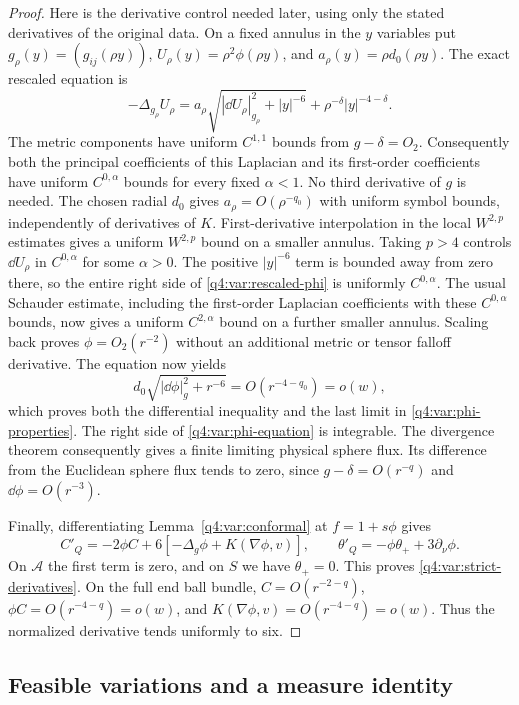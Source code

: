 \begin{proof}
Here is the derivative control needed later, using only the stated
derivatives of the original data. On a fixed annulus in the $y$ variables
put $g_\rho(y)=(g_{ij}(\rho y))$, $U_\rho(y)=\rho^2\phi(\rho y)$, and
$a_\rho(y)=\rho d_0(\rho y)$. The exact rescaled equation is
\begin{equation}
 -\Delta_{g_\rho}U_\rho
 =a_\rho\sqrt{|\dd U_\rho|_{g_\rho}^2+|y|^{-6}}
       +\rho^{-\delta}|y|^{-4-\delta}.
\label{q4:var:rescaled-phi}
\end{equation}
The metric components have uniform $C^{1,1}$ bounds from $g-\delta=O_2$.
Consequently both the principal coefficients of this Laplacian and its
first-order coefficients have uniform $C^{0,\alpha}$ bounds for every
fixed $\alpha<1$. No third derivative of $g$ is needed. The chosen
radial $d_0$ gives $a_\rho=O(\rho^{-q_0})$ with uniform symbol bounds,
independently of derivatives of $K$. First-derivative interpolation in
the local $W^{2,p}$ estimates gives a uniform $W^{2,p}$ bound on a smaller
annulus. Taking $p>4$ controls $\dd U_\rho$ in $C^{0,\alpha}$ for some
$\alpha>0$. The positive $|y|^{-6}$ term is bounded away from zero there,
so the entire right side of \eqref{q4:var:rescaled-phi} is uniformly
$C^{0,\alpha}$. The usual Schauder estimate, including the first-order
Laplacian coefficients with these $C^{0,\alpha}$ bounds, now gives a
uniform $C^{2,\alpha}$ bound on a further smaller annulus. Scaling back
proves $\phi=O_2(r^{-2})$ without an additional metric or tensor
falloff derivative.
The equation now yields
\[
 d_0\sqrt{|\dd\phi|_g^2+r^{-6}}=O(r^{-4-q_0})=o(w),
\]
which proves both the differential inequality and the last limit in
\eqref{q4:var:phi-properties}. The right side of \eqref{q4:var:phi-equation} is
integrable. The divergence theorem consequently gives a finite limiting
physical sphere flux. Its difference from the Euclidean sphere flux tends
to zero, since $g-\delta=O(r^{-q})$ and $\dd\phi=O(r^{-3})$.

Finally, differentiating Lemma~\ref{q4:var:conformal} at $f=1+s\phi$ gives
\[
 C'_Q=-2\phi C+6[-\Delta_g\phi+K(\nabla\phi,v)],
 \qquad \theta'_Q=-\phi\theta_++3\partial_\nu\phi.
\]
On $\mathcal A$ the first term is zero, and on $S$ we have
$\theta_+=0$. This proves \eqref{q4:var:strict-derivatives}.
On the full end ball bundle, $C=O(r^{-2-q})$,
$\phi C=O(r^{-4-q})=o(w)$, and
$K(\nabla\phi,v)=O(r^{-4-q})=o(w)$. Thus the normalized derivative tends
uniformly to six.
\end{proof}

\subsection{Feasible variations and a measure identity}

